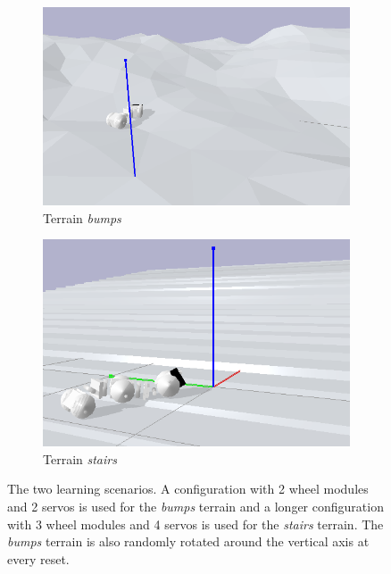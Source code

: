 \documentclass{article}
\begin{document}
\begin{figure}[ht]
\begin{subfigure}{.5\textwidth}
  \centering
  \includegraphics[width=.95\linewidth]{fig/bumps.png}  
  \caption{Terrain \textit{bumps}}
  \label{fig:sub-first}
\end{subfigure}
\begin{subfigure}{.5\textwidth}
  \centering
  \includegraphics[width=.95\linewidth]{fig/stairs.png}  
  \caption{Terrain \textit{stairs}}
  \label{fig:sub-second}
\end{subfigure}
  \caption{The two learning scenarios. 
  A configuration with 2 wheel modules and 2 servos is used for the \textit{bumps} terrain and a longer configuration with 3 wheel modules and 4 servos is used for the \textit{stairs} terrain.
  The \textit{bumps} terrain is also randomly rotated around the vertical axis at every reset. }
\label{fig:terrains}
\end{figure}
\end{document}
